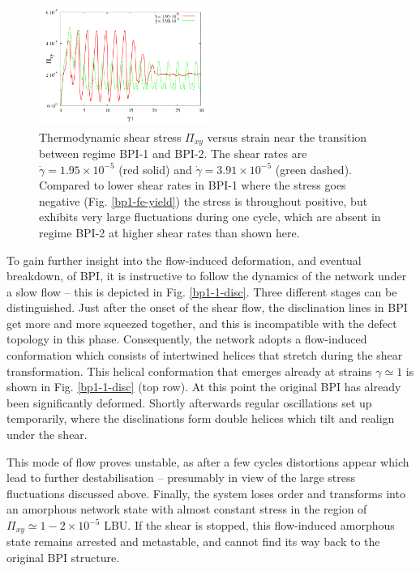 \documentclass[8.5pt,twoside,twocolumn]{article}
\newcommand{\e}[1]{\times10^{#1}}
\newcommand{\gd}{\dot{\gamma}}
\begin{document}
\begin{figure}[htpb]
\includegraphics[width=0.495\textwidth]{stress_bp1-1_bp1-2.pdf}
\caption{Thermodynamic shear stress $\Pi_{xy}$ versus strain near the 
transition between regime BPI-1 and BPI-2. 
The shear rates are $\gd=1.95\e{-5}$ (red solid) 
and $\gd=3.91\e{-5}$ (green dashed). Compared to lower shear rates in BPI-1 
where the stress goes negative (Fig. \ref{bp1-fe-yield}) the stress is 
throughout positive, but exhibits very large fluctuations during one cycle, 
which are absent in regime BPI-2 at higher shear rates than shown here.}
\label{bp1-1_bp1-2}
\end{figure}

To gain further insight into the flow-induced deformation, and eventual
breakdown, of BPI, it is instructive to follow the dynamics of 
the network under a slow flow -- this is depicted in Fig. \ref{bp1-1-disc}.
Three different stages can be distinguished. 
Just after the onset of the shear flow, the disclination lines 
in BPI get more and more squeezed together, and this is incompatible with
the defect topology in this phase.
Consequently, the network adopts a flow-induced conformation which consists 
of intertwined helices that stretch during the shear transformation.
This helical conformation that emerges already at strains $\gamma\simeq1$ 
is shown in Fig. \ref{bp1-1-disc} (top row).
At this point the original BPI has already been significantly deformed.
Shortly afterwards regular oscillations set up temporarily,
where the disclinations form double helices which tilt and realign under the shear.

This mode of flow proves unstable, as after a few cycles 
distortions appear which lead to further destabilisation -- presumably in
view of the large stress fluctuations discussed above. 
Finally, the system loses order and 
transforms into an amorphous network state with almost constant
stress in the region of $\Pi_{xy}\simeq 1-2\e{-5}$ LBU.
If the shear is stopped, this flow-induced amorphous state
remains arrested and metastable, and cannot
find its way back to the original BPI structure.
\end{document}
